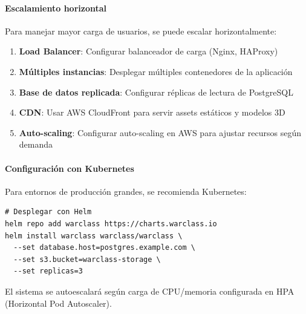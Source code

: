 \paragraph{Escalamiento horizontal}

Para manejar mayor carga de usuarios, se puede escalar horizontalmente:

\begin{enumerate}
	\item \textbf{Load Balancer}: Configurar balanceador de carga (Nginx, HAProxy)
	\item \textbf{Múltiples instancias}: Desplegar múltiples contenedores de la aplicación
	\item \textbf{Base de datos replicada}: Configurar réplicas de lectura de PostgreSQL
	\item \textbf{CDN}: Usar AWS CloudFront para servir assets estáticos y modelos 3D
	\item \textbf{Auto-scaling}: Configurar auto-scaling en AWS para ajustar recursos según demanda
\end{enumerate}

\paragraph{Configuración con Kubernetes}

Para entornos de producción grandes, se recomienda Kubernetes:

\begin{verbatim}
# Desplegar con Helm
helm repo add warclass https://charts.warclass.io
helm install warclass warclass/warclass \
  --set database.host=postgres.example.com \
  --set s3.bucket=warclass-storage \
  --set replicas=3
\end{verbatim}

El sistema se autoescalará según carga de CPU/memoria configurada en HPA (Horizontal Pod Autoscaler).
